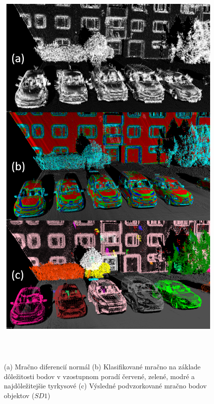 \newpage\vfill
\begin{figure}[ht]
  \centering
  \includegraphics[width=15cm, height=21cm]{img/downsample_objects.png}
  \caption{(a) Mračno diferencií normál (b) Klasifikované mračno na základe dôležitosti bodov v vzostupnom poradí červené, zelené, modré a najdôležitejšie tyrkysové (c) Výsledné podvzorkované mračno bodov objektov ($SD1$)} 
  \label{fig:downsampling_objects}
\end{figure} 
\vfill\clearpage

